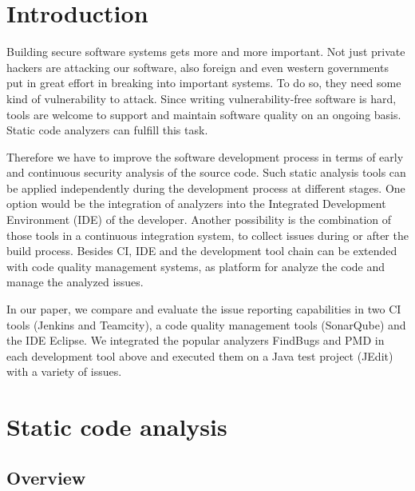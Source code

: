 \documentclass[conference]{IEEEtran}
\begin{document}
\section{Introduction}
Building secure software systems gets more and more important. Not just private hackers are attacking our software, also foreign and even western governments put in great effort in breaking into important systems\cite{NSAHacking}. To do so, they need some kind of vulnerability to attack. Since writing vulnerability-free software is hard, tools are welcome to support and maintain software quality on an ongoing basis. Static code analyzers can fulfill this task.




Therefore we have to improve the software development process in terms of early and continuous security analysis of the source code.
Such static analysis tools can be applied independently during the development process at different stages.
One option would be the integration of analyzers into the Integrated Development Environment (IDE) of the developer.
Another possibility is the combination of those tools in a continuous integration system, to collect issues during or after the build process.
Besides CI, IDE and the development tool chain can be extended with code quality management systems, as platform for analyze the code and manage the analyzed issues.


In our paper, we compare and evaluate the issue reporting capabilities in two CI tools (Jenkins and Teamcity), a code quality management tools (SonarQube) and the IDE Eclipse.
We integrated the popular analyzers FindBugs and PMD in each development tool above and executed them on a Java test project (JEdit) with a variety of issues.






\section{Static code analysis}
\subsection{Overview}

\end{document}

